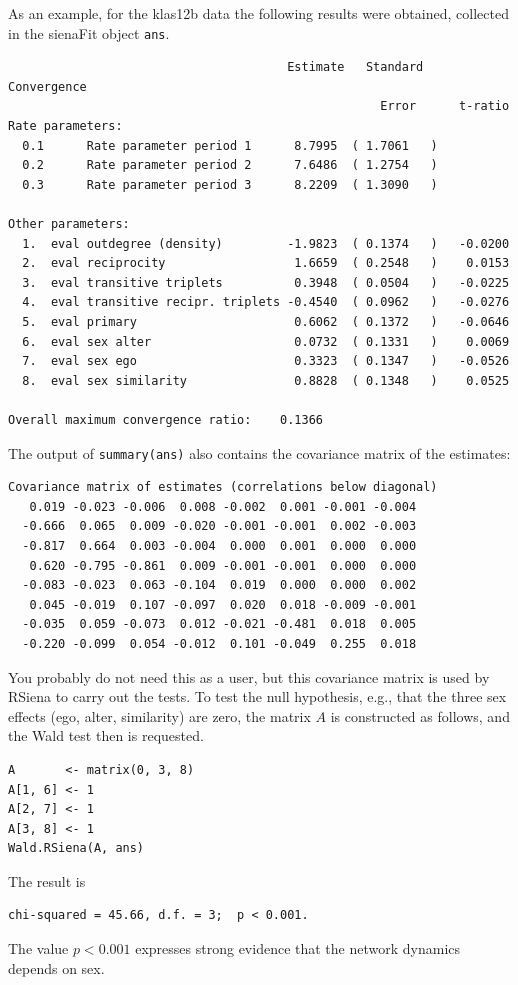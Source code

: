 \documentclass[a4paper,fleqn,11pt]{article}
\newcommand{\+}{\, + \,}
\newcommand{\RS}{{\sf RSiena }}
\begin{document}
As an example, for the \textsf{klas12b} data
the following results were obtained,
collected in the \textsf{sienaFit} object \texttt{ans}.
\begin{small}
\begin{verbatim}
                                       Estimate   Standard   Convergence
                                                    Error      t-ratio
Rate parameters:
  0.1      Rate parameter period 1      8.7995  ( 1.7061   )
  0.2      Rate parameter period 2      7.6486  ( 1.2754   )
  0.3      Rate parameter period 3      8.2209  ( 1.3090   )

Other parameters:
  1.  eval outdegree (density)         -1.9823  ( 0.1374   )   -0.0200
  2.  eval reciprocity                  1.6659  ( 0.2548   )    0.0153
  3.  eval transitive triplets          0.3948  ( 0.0504   )   -0.0225
  4.  eval transitive recipr. triplets -0.4540  ( 0.0962   )   -0.0276
  5.  eval primary                      0.6062  ( 0.1372   )   -0.0646
  6.  eval sex alter                    0.0732  ( 0.1331   )    0.0069
  7.  eval sex ego                      0.3323  ( 0.1347   )   -0.0526
  8.  eval sex similarity               0.8828  ( 0.1348   )    0.0525

Overall maximum convergence ratio:    0.1366
\end{verbatim}
\end{small}
The output of \texttt{summary(ans)} also contains the
covariance matrix of the estimates:
\begin{footnotesize}
\begin{verbatim}
Covariance matrix of estimates (correlations below diagonal)
   0.019 -0.023 -0.006  0.008 -0.002  0.001 -0.001 -0.004
  -0.666  0.065  0.009 -0.020 -0.001 -0.001  0.002 -0.003
  -0.817  0.664  0.003 -0.004  0.000  0.001  0.000  0.000
   0.620 -0.795 -0.861  0.009 -0.001 -0.001  0.000  0.000
  -0.083 -0.023  0.063 -0.104  0.019  0.000  0.000  0.002
   0.045 -0.019  0.107 -0.097  0.020  0.018 -0.009 -0.001
  -0.035  0.059 -0.073  0.012 -0.021 -0.481  0.018  0.005
  -0.220 -0.099  0.054 -0.012  0.101 -0.049  0.255  0.018
\end{verbatim}
\end{footnotesize}
You probably do not need this as a user, but this covariance matrix
is used by \RS to carry out the tests.
To test the null hypothesis, e.g., that the three sex effects
(ego, alter, similarity) are zero,
the matrix $A$ is constructed as follows, and the Wald test then is requested.
\begin{small}
\begin{verbatim}
A       <- matrix(0, 3, 8)
A[1, 6] <- 1
A[2, 7] <- 1
A[3, 8] <- 1
Wald.RSiena(A, ans)
\end{verbatim}
\end{small}
The result is
\begin{small}
\begin{verbatim}
chi-squared = 45.66, d.f. = 3;  p < 0.001.
\end{verbatim}
\end{small}
The value $p < 0.001$ expresses strong evidence
that the network dynamics depends on sex.
\bigskip
\end{document}

